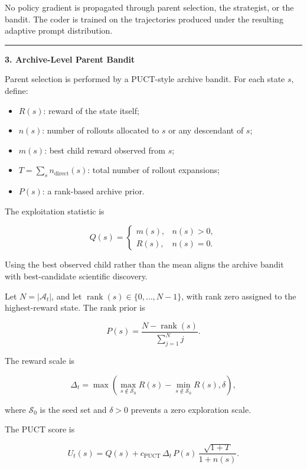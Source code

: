 \documentclass[
]{article}
\providecommand{\tightlist}{%
  \setlength{\itemsep}{0pt}\setlength{\parskip}{0pt}}
\begin{document}
No policy gradient is propagated through parent selection, the
strategist, or the bandit. The coder is trained on the trajectories
produced under the resulting adaptive prompt distribution.

\begin{center}\rule{0.5\linewidth}{0.5pt}\end{center}

\textbf{3. Archive-Level Parent Bandit}

Parent selection is performed by a PUCT-style archive bandit. For each
state \(s\), define:

\begin{itemize}
\tightlist
\item
  \(R(s)\): reward of the state itself;
\item
  \(n(s)\): number of rollouts allocated to \(s\) or any descendant of
  \(s\);
\item
  \(m(s)\): best child reward observed from \(s\);
\item
  \(T=\sum_s n_{\mathrm{direct}}(s)\): total number of rollout
  expansions;
\item
  \(P(s)\): a rank-based archive prior.
\end{itemize}

The exploitation statistic is

\[
Q(s)=
\begin{cases}
m(s), & n(s)>0,\\[2mm]
R(s), & n(s)=0.
\end{cases}
\]

Using the best observed child rather than the mean aligns the archive
bandit with best-candidate scientific discovery.

Let \(N=|\mathcal{A}_t|\), and let
\(\operatorname{rank}(s)\in\{0,\ldots,N-1\}\), with rank zero assigned
to the highest-reward state. The rank prior is

\[
P(s)
=
\frac{N-\operatorname{rank}(s)}
{\sum_{j=1}^{N}j}.
\]

The reward scale is

\[
\Delta_t
=
\max\!\left(
\max_{s\notin\mathcal{S}_0}R(s)
-
\min_{s\notin\mathcal{S}_0}R(s),
\delta
\right),
\]

where \(\mathcal{S}_0\) is the seed set and \(\delta>0\) prevents a zero
exploration scale.

The PUCT score is

\[
U_t(s)
=
Q(s)
+
c_{\mathrm{PUCT}}\,
\Delta_t\,
P(s)\,
\frac{\sqrt{1+T}}{1+n(s)}.
\]
\end{document}
